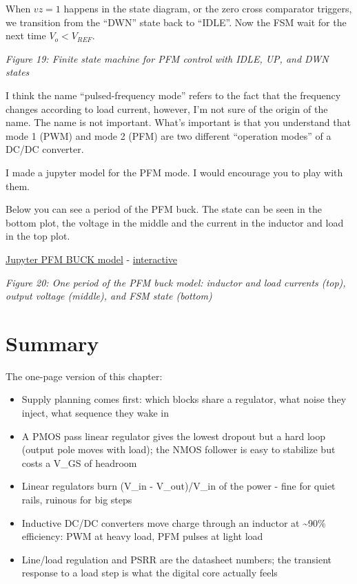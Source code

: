 When \(vz=1\) happens in the state diagram, or the zero cross comparator
triggers, we transition from the ``DWN'' state back to ``IDLE''. Now the
FSM wait for the next time \(V_o < V_{REF}\).


{
\centering
{}
}

\emph{Figure 19: Finite state machine for PFM control with IDLE, UP, and
DWN states}

I think the name ``pulsed-frequency mode'' refers to the fact that the
frequency changes according to load current, however, I'm not sure of
the origin of the name. The name is not important. What's important is
that you understand that mode 1 (PWM) and mode 2 (PFM) are two different
``operation modes'' of a DC/DC converter.

I made a jupyter model for the PFM mode. I would encourage you to play
with them.

Below you can see a period of the PFM buck. The state can be seen in the
bottom plot, the voltage in the middle and the current in the inductor
and load in the top plot.

\href{https://github.com/wulffern/aic2026/blob/main/jupyter/buck_pfm.ipynb}{Jupyter
PFM BUCK model} -
\href{https://wulffern.github.io/aic2026/assets/examples/buck-pfm.html}{interactive}


{
\centering
{}
}

\emph{Figure 20: One period of the PFM buck model: inductor and load
currents (top), output voltage (middle), and FSM state (bottom)}

\section{Summary}\label{summary}

The one-page version of this chapter:

\begin{itemize}
\tightlist
\item
  Supply planning comes first: which blocks share a regulator, what
  noise they inject, what sequence they wake in
\item
  A PMOS pass linear regulator gives the lowest dropout but a hard loop
  (output pole moves with load); the NMOS follower is easy to stabilize
  but costs a V\_GS of headroom
\item
  Linear regulators burn (V\_in - V\_out)/V\_in of the power - fine for
  quiet rails, ruinous for big steps
\item
  Inductive DC/DC converters move charge through an inductor at
  \textasciitilde90\% efficiency: PWM at heavy load, PFM pulses at light
  load
\item
  Line/load regulation and PSRR are the datasheet numbers; the transient
  response to a load step is what the digital core actually feels
\end{itemize}

